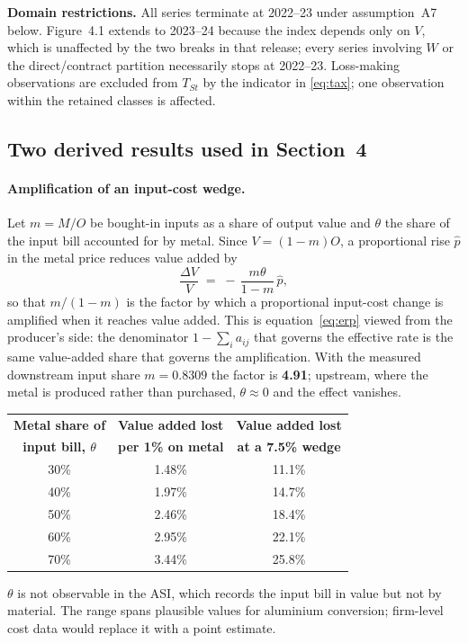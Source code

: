 \documentclass[11pt, a4paper]{article}
\numberwithin{figure}{section}
\numberwithin{table}{section}
\begin{document}
\noindent \textbf{Domain restrictions.} All series terminate at 2022--23 under
assumption~A7 below. Figure~4.1 extends to 2023--24 because the index depends only on
$V$, which is unaffected by the two breaks in that release; every series involving
$W$ or the direct/contract partition necessarily stops at 2022--23. Loss-making
observations are excluded from $T_{St}$ by the indicator in \eqref{eq:tax}; one
observation within the retained classes is affected.

\subsection{Two derived results used in Section~4}

\paragraph{Amplification of an input-cost wedge.} Let $m = M/O$ be bought-in inputs as
a share of output value and $\theta$ the share of the input bill accounted for by
metal. Since $V = (1-m)O$, a proportional rise $\hat p$ in the metal price reduces
value added by
\begin{equation}
    \frac{\Delta V}{V} \;=\; -\,\frac{m\theta}{1-m}\,\hat p ,
    \label{eq:passthrough}
\end{equation}
so that $m/(1-m)$ is the factor by which a proportional input-cost change is
amplified when it reaches value added. This is equation~\eqref{eq:erp} viewed from
the producer's side: the denominator $1 - \sum_i a_{ij}$ that governs the effective
rate is the same value-added share that governs the amplification. With the measured
downstream input share $m = 0.8309$ the factor is \textbf{4.91}; upstream, where the
metal is produced rather than purchased, $\theta \approx 0$ and the effect vanishes.

\begin{table}[H]
    \centering
    \small
    \begin{tabular}{ccc}
        \toprule
        \textbf{Metal share of} & \textbf{Value added lost} & \textbf{Value added lost} \\
        \textbf{input bill, $\theta$} & \textbf{per 1\% on metal} & \textbf{at a 7.5\% wedge} \\
        \midrule
        30\% & 1.48\% & 11.1\% \\
        40\% & 1.97\% & 14.7\% \\
        50\% & 2.46\% & 18.4\% \\
        60\% & 2.95\% & 22.1\% \\
        70\% & 3.44\% & 25.8\% \\
        \bottomrule
    \end{tabular}

    \vspace{0.15cm}
    \raggedright
    \small $\theta$ is not observable in the ASI, which records the input bill in
    value but not by material. The range spans plausible values for aluminium
    conversion; firm-level cost data would replace it with a point estimate.
\end{table}
\end{document}
